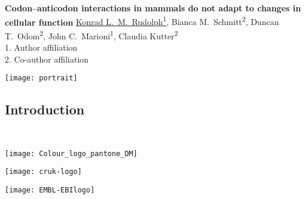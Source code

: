\documentclass[a0,portrait]{a0poster}
\begin{document}
\sffamily

\begin{minipage}[][][t]{0.88\textwidth}
    {
        \veryHuge\color{EMBLBlue}\bfseries\sffamily%
        Codon–anticodon interactions in mammals do not adapt to changes in
        cellular function\hfill
    }
    {
        \Large\color{Black}%
        \underline{Konrad L.\ M.\ Rudolph\textsuperscript{1}},
        Bianca M.\ Schmitt\textsuperscript{2},
        Duncan T.\ Odom\textsuperscript{2},
        John C.\ Marioni\textsuperscript{1},
        Claudia Kutter\textsuperscript{2}
    }
    \\[0.5cm]
    \normalsize%
    1. Author affiliation\\
    2. Co-author affiliation
\end{minipage}%
\hfill%
\begin{minipage}[][][t]{0.1\textwidth}
    \texttt{[image: portrait]}
\end{minipage}

\vspace{1cm}
\renewcommand\baselinestretch{1}

\begin{multicols}{2}
\large

\section*{Introduction}
\blindtext ~\citep{Reynolds2012a}

\small
\begin{multicols}{2}
    
\end{multicols}
\end{multicols}

\vfill

\begin{minipage}[][][b]{0.3\textwidth}
    \centering
    \texttt{[image: Colour\_logo\_pantone\_DM]}
\end{minipage}%
\hfill%
\begin{minipage}[][][b]{0.3\textwidth}
    \centering
    \texttt{[image: cruk-logo]}
\end{minipage}%
\hfill%
\begin{minipage}[][][b]{0.3\textwidth}
    \centering
    \texttt{[image: EMBL-EBIlogo]}
\end{minipage}%
\end{document}
